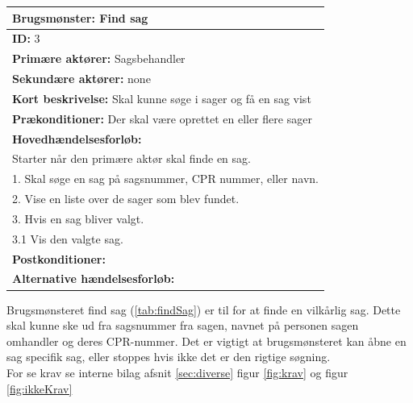 \begin{center} \label{tab:findSag}
\begin{longtable}{|p{18cm}|}
\hline
\textbf{Brugsmønster: }Find sag \\
\hline
\textbf{ID: }3\\
\hline
\textbf{Primære aktører: }Sagsbehandler\\
\hline
\textbf{Sekundære aktører: }none\\
\hline
\textbf{Kort beskrivelse: }Skal kunne søge i sager og få en sag vist\\
\hline
\textbf{Prækonditioner: }Der skal være oprettet en eller flere sager\\
\hline
\textbf{Hovedhændelsesforløb: }\\
Starter når den primære aktør skal finde en sag.\\
1. Skal søge en sag på sagsnummer, CPR nummer, eller navn.\\
2. Vise en liste over de sager som blev fundet.\\
3. Hvis en sag bliver valgt.\\
3.1 Vis den valgte sag.\\
\hline
\textbf{Postkonditioner: }\\
\hline
\textbf{Alternative hændelsesforløb: }\\
\hline
\end{longtable}
\end{center}
Brugsmønsteret find sag (\ref{tab:findSag}) er til for at finde en vilkårlig sag. Dette skal kunne ske ud fra sagsnummer fra sagen, navnet på personen sagen omhandler og deres CPR-nummer. Det er vigtigt at brugsmønsteret kan åbne en sag specifik sag, eller stoppes hvis ikke det er den rigtige søgning. \\
For se krav se interne bilag afsnit \ref{sec:diverse} figur \ref{fig:krav} og figur \ref{fig:ikkeKrav} 



